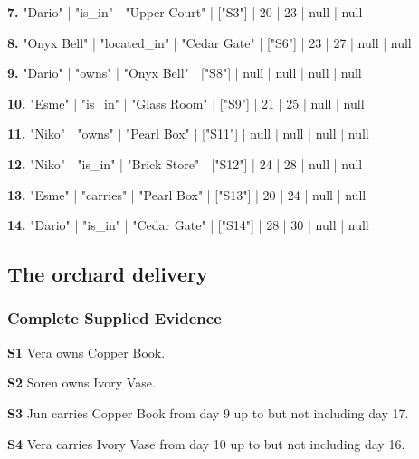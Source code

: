 \noindent\textbf{7.} "Dario" | "is\_in" | "Upper Court" | ["S3"] | 20 | 23 | null | null\par\smallskip

\noindent\textbf{8.} "Onyx Bell" | "located\_in" | "Cedar Gate" | ["S6"] | 23 | 27 | null | null\par\smallskip

\noindent\textbf{9.} "Dario" | "owns" | "Onyx Bell" | ["S8"] | null | null | null | null\par\smallskip

\noindent\textbf{10.} "Esme" | "is\_in" | "Glass Room" | ["S9"] | 21 | 25 | null | null\par\smallskip

\noindent\textbf{11.} "Niko" | "owns" | "Pearl Box" | ["S11"] | null | null | null | null\par\smallskip

\noindent\textbf{12.} "Niko" | "is\_in" | "Brick Store" | ["S12"] | 24 | 28 | null | null\par\smallskip

\noindent\textbf{13.} "Esme" | "carries" | "Pearl Box" | ["S13"] | 20 | 24 | null | null\par\smallskip

\noindent\textbf{14.} "Dario" | "is\_in" | "Cedar Gate" | ["S14"] | 28 | 30 | null | null\par\smallskip

\clearpage\subsection*{The orchard delivery}

\subsubsection*{Complete Supplied Evidence}

\noindent\textbf{S1} Vera owns Copper Book.\par\smallskip

\noindent\textbf{S2} Soren owns Ivory Vase.\par\smallskip

\noindent\textbf{S3} Jun carries Copper Book from day 9 up to but not including day 17.\par\smallskip

\noindent\textbf{S4} Vera carries Ivory Vase from day 10 up to but not including day 16.\par\smallskip

